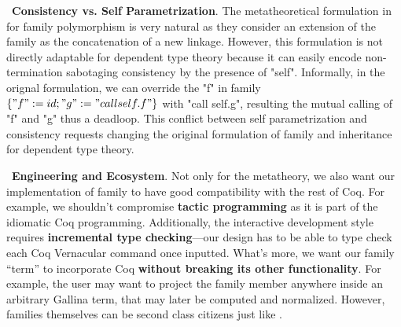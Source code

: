 ~\textbf{Consistency vs. Self Parametrization}. The metatheoretical formulation in~\citet{zm2017} for family polymorphism is very natural as they consider an extension of the family as the concatenation of a new linkage. However, this formulation is not directly adaptable for dependent type theory because it can easily encode non-termination sabotaging consistency by the presence of "self". Informally, in the orignal formulation, we can override the "f" in family $\{"f" := id; "g" := "call self.f"\}$ with "call self.g", resulting the mutual calling of "f" and "g" thus a deadloop. This conflict between self parametrization and consistency requests changing the original formulation of family and inheritance for dependent type theory.


~\textbf{Engineering and Ecosystem}.  Not only for the metatheory, we also want our implementation of family to have good compatibility with the rest of Coq. For example, we shouldn't compromise \textbf{tactic programming} as it is part of the idiomatic Coq programming. Additionally, the interactive development style requires \textbf{incremental type checking}---our design has to be able to type check each Coq Vernacular command once inputted. What's more, we want our family ``term'' to incorporate Coq \textbf{without breaking its other functionality}. For example, the user may want to project the family member anywhere inside an arbitrary Gallina term, that may later be computed and normalized. However, families themselves can be second class citizens just like \citet{zm2017}.



